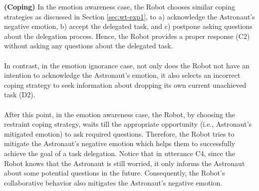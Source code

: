 \noindent\textbf{(Coping)} In the emotion awareness case, the Robot chooses
similar coping strategies as discussed in Section \ref{sec:wt-exp1}, to a) 
acknowledge the Astronaut's negative emotion, b) accept the delegated task,
and c) postpone asking questions about the delegation process. Hence, the
Robot provides a proper response (C2) without asking any questions about the
delegated task.\\

\noindent{}\\

In contrast, in the emotion ignorance case, not only does the Robot not have
an intention to acknowledge the Astronaut's emotion, it also selects an
incorrect coping strategy to seek information about dropping its own current
unachieved task (D2).\\

\noindent{}\\

After this point, in the emotion awareness case, the Robot, by choosing the
restraint coping strategy, waits till the appropriate opportunity (i.e.,
Astronaut's mitigated emotion) to ask required questions. Therefore, the Robot
tries to mitigate the Astronaut's negative emotion which helps them to
successfully achieve the goal of a task delegation. Notice that in utterance C4,
since the Robot knows that the Astronaut is still worried, it only informs the
Astronaut about some potential questions in the future. Consequently, the
Robot's collaborative behavior also mitigates the Astronaut's negative
emotion.\\

\noindent{}\\

